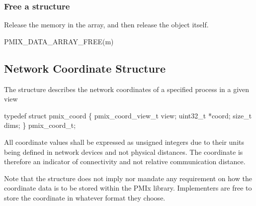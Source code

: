 \begin{arglist}
\end{arglist}


\subsubsection{Free a  structure}

Release the memory in the array, and then release the  object itself.

\cspecificstart
\begin{codepar}
PMIX_DATA_ARRAY_FREE(m)
\end{codepar}
\cspecificend

\begin{arglist}
\end{arglist}


\subsection{Network Coordinate Structure}

The  structure describes the network coordinates of a specified process in a given view

\cspecificstart
\begin{codepar}
typedef struct pmix_coord \{
    pmix_coord_view_t view;
    uint32_t *coord;
    size_t dims;
\} pmix_coord_t;
\end{codepar}
\cspecificend

All coordinate values shall be expressed as unsigned integers due to their units being defined in network devices and not physical distances. The coordinate is therefore an indicator of connectivity and not relative communication distance.

\adviceimplstart
Note that the  structure does not imply nor mandate any requirement on how the coordinate data is to be stored within the \ac{PMIx} library. Implementers are free to store the coordinate in whatever format they choose.
\adviceimplend

